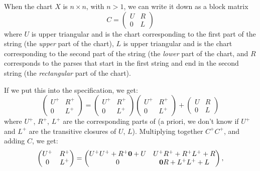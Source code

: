 When the chart $X$ is $n \times n$, with $n > 1$, we can write it down as a block matrix 
\begin{equation*}
  C = 
  \begin{pmatrix}
    U & R \\
    0 & L
  \end{pmatrix}
\end{equation*}
where $U$ is upper triangular and is the chart corresponding to the first part of the string (the \emph{upper} part of the chart), $L$ is upper triangular and is the chart corresponding to the second part of the string (the \emph{lower} part of the chart, and $R$ corresponds to the parses that start in the first string and end in the second string (the \emph{rectangular} part of the chart).

If we put this into the specification, we get:
\begin{equation*}
  \begin{pmatrix}
    U^+ & R^+ \\
    0   & L^+
  \end{pmatrix}
  =  
  \begin{pmatrix}
    U^+ & R^+ \\
    0   & L^+
  \end{pmatrix}
  \begin{pmatrix}
    U^+ & R^+ \\
    0   & L^+
  \end{pmatrix}
  +
  \begin{pmatrix}
    U & R \\
    0 & L
  \end{pmatrix}
\end{equation*}
where $U^+$, $R^+$, $L^+$ are the corresponding parts of (a priori, we don't know if $U^+$ and $L^+$ are the transitive closures of $U$, $L$). Multiplying together $C^+C^+$, and adding $C$, we get:
\begin{equation*}
    \begin{pmatrix}
    U^+ & R^+ \\
    0   & L^+
  \end{pmatrix} 
    =
  \begin{pmatrix}
    U^+U^+ + R^+\mathbf{0} + U   &   U^+R^+     + R^+L^+ + R \\
    0                          &   \mathbf{0} R + L^+L^+ + L
  \end{pmatrix}
  ,
\end{equation*}
